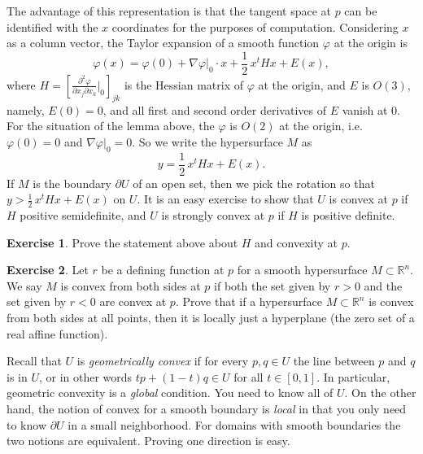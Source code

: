 \documentclass[12pt,openany]{book}
\newcommand{\R}{{\mathbb{R}}}
\newcommand{\myindex}[1]{#1\index{#1}}
\theoremstyle{plain}
\theoremstyle{remark}
\theoremstyle{definition}
\newenvironment{exbox}{%
    \def\FrameCommand{\vrule width 1pt \relax\hspace{10pt}}%
    \MakeFramed{\advance\hsize-\width\FrameRestore}%
}{%
    \endMakeFramed
}
\theoremstyle{exercise}
\newtheorem{exercise}{Exercise}[section]
\theoremstyle{example}
\begin{document}
The advantage of this representation is that the tangent space at $p$
can be identified with the $x$ coordinates for the purposes of computation.
Considering $x$ as a column vector, the Taylor expansion of a smooth function $\varphi$ at the origin is
\begin{equation*}
\varphi(x) = \varphi(0) + \nabla \varphi|_0 \cdot x + \frac{1}{2}\, x^t H x + E(x) ,
\end{equation*}
where $H = \left[
\frac{\partial^2 \varphi}{\partial x_j \partial x_k} \big|_{0} \right]_{jk}$ is the Hessian matrix of $\varphi$ at the origin,
and $E$ is $O(3)$, namely, $E(0) = 0$, and
all first and second order derivatives of $E$ vanish at $0$.
For the situation of the lemma above,
the $\varphi$ is $O(2)$ at the origin, i.e.\ $\varphi(0) = 0$
and $\nabla \varphi|_0 = 0$.  So we write the hypersurface
$M$ as
\begin{equation*}
y = \frac{1}{2}\, x^t H x + E(x) .
\end{equation*}
If $M$ is the boundary
$\partial U$ of an open set, then
we pick the rotation so that $y > \frac{1}{2}\,x^t H x + E(x)$ on $U$.
It is an easy exercise to show that $U$ is convex at $p$ if
$H$ positive semidefinite, and $U$ is strongly convex at $p$ if $H$ is positive definite.

\begin{exbox}
\begin{exercise}
Prove the statement above about $H$ and convexity at $p$.
\end{exercise}

\begin{exercise}
Let $r$ be a defining function at $p$ for a smooth hypersurface
$M \subset \R^n$.
We say $M$ is convex from both sides at $p$ if both the set given by
$r > 0$ and the set given by $r < 0$ are convex at $p$.
Prove that if a hypersurface $M \subset \R^n$ is convex from both sides at all
points, then it is locally just a hyperplane (the zero set of a real affine
function).
\end{exercise}
\end{exbox}

Recall that $U$ is \emph{\myindex{geometrically convex}} if for every $p,q \in U$ the
line between $p$ and $q$ is in $U$, or in other words
$tp +(1-t)q \in U$ for all $t \in [0,1]$.
In particular, geometric convexity is a \emph{global} condition.  You need 
to know all of $U$.  On the other hand, the notion of convex for a smooth boundary is
\emph{local} in that you only need to know $\partial U$ in a small
neighborhood.  For domains with
smooth boundaries the two notions are equivalent.  Proving
one direction is easy.
\end{document}
